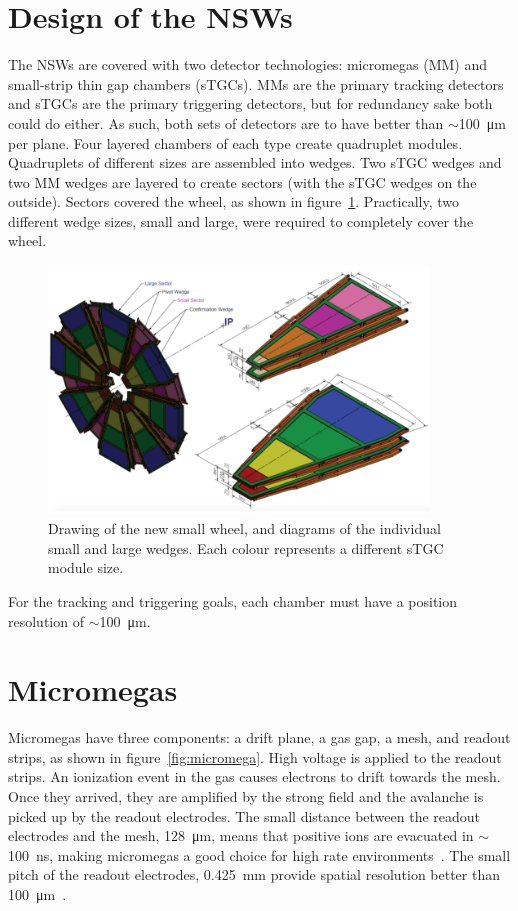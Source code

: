\section{Design of the NSWs}

The NSWs are covered with two detector technologies: micromegas (MM) and small-strip thin gap chambers (sTGCs). MMs are the primary tracking detectors and sTGCs are the primary triggering detectors, but for redundancy sake both could do either. As such, both sets of detectors are to have better than $\sim$\SI{100}{\micro\meter} per plane. Four layered chambers of each type create quadruplet modules. Quadruplets of different sizes are assembled into wedges. Two sTGC wedges and two MM wedges are layered to create sectors (with the sTGC wedges on the outside). Sectors covered the wheel, as shown in figure~\ref{fig:nsw_diagram}. Practically, two different wedge sizes, small and large, were required to completely cover the wheel.
\begin{figure}
    \centering
    \includegraphics[width = 0.9\textwidth]{figures/nsw_diagram.png}
    \caption{Drawing of the new small wheel, and diagrams of the individual small and large wedges. Each colour represents a different sTGC module size.}
    \label{fig:nsw_diagram}
\end{figure}

For the tracking and triggering goals, each chamber must have a position resolution of $\sim$\SI{100}{\micro\meter}. 

\section{Micromegas}

Micromegas have three components: a drift plane, a gas gap, a mesh, and readout strips, as shown in figure~\ref{fig:micromega}. High voltage is applied to the readout strips. An ionization event in the gas causes electrons to drift towards the mesh. Once they arrived, they are amplified by the strong field and the avalanche is picked up by the readout electrodes. The small distance between the readout electrodes and the mesh, \SI{128}{\micro\meter}, means that positive ions are evacuated in $\sim$\SI{100}{\nano\second}, making micromegas a good choice for high rate environments~\cite{nsw_tdr}. The small pitch of the readout electrodes, \SI{0.425}{mm} provide spatial resolution better than \SI{100}{\micro\meter}~\cite{stelzer_new_2016}.

